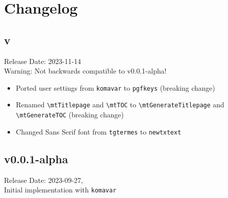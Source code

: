 \chapter{Changelog}
	\section{v\releaseVersion}
		Release Date: 2023-11-14\\
		Warning: Not backwards compatible to v0.0.1-alpha!
		\begin{itemize}
			\item Ported user settings from \verb|komavar| to \verb|pgfkeys| (breaking change)
			\item Renamed \verb|\mtTitlepage| and \verb|\mtTOC| to \verb|\mtGenerateTitlepage| and\\ \verb|\mtGenerateTOC| (breaking change)
			\item Changed Sans Serif font from \verb|tgtermes| to \verb|newtxtext| 
		\end{itemize}
	
	\section{v0.0.1-alpha}
		Release Date: 2023-09-27,\\
		Initial implementation with \verb|komavar|